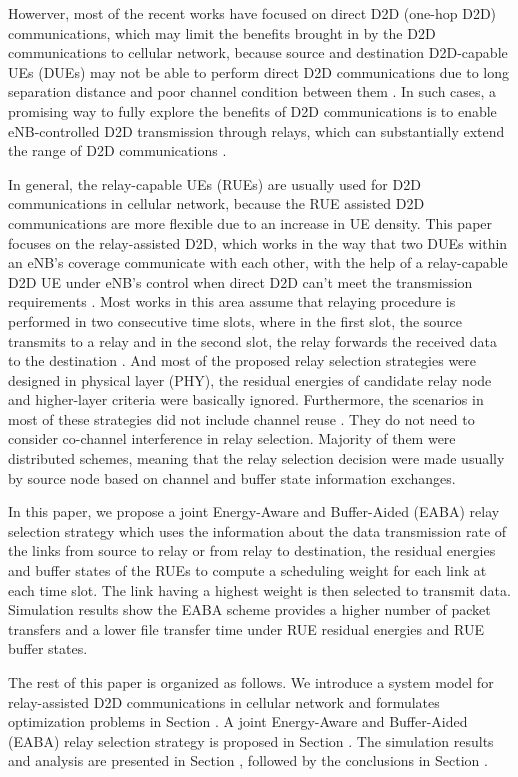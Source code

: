 \documentclass[conference]{IEEEtran}
\begin{document}
Howerver, most of the recent works have focused on direct D2D (one-hop D2D) communications, which may limit the benefits brought in by the D2D communications to cellular network, because source and destination D2D-capable UEs (DUEs) may not be able to perform direct D2D communications due to long separation distance and poor channel condition between them \cite{7876267}. In such cases, a promising way to fully explore the benefits of D2D communications is to enable eNB-controlled D2D transmission through relays, which can substantially extend the range of D2D communications \cite{7925800}.

In general, the relay-capable UEs (RUEs) are usually used for D2D communications in cellular network, because the RUE assisted D2D communications are more flexible due to an increase in UE density. This paper focuses on the relay-assisted D2D, which works in the way that two DUEs within an eNB's coverage communicate with each other, with the help of a relay-capable D2D UE under eNB's control when direct D2D can't meet the transmission requirements \cite{7450161,6940431,7752964}. Most works in this area assume that relaying procedure is performed in two consecutive time slots, where in the first slot, the source transmits to a relay and in the second slot, the relay forwards the received data to the destination \cite{6807959}. And most of the proposed relay selection strategies were designed in physical layer (PHY), the residual energies of candidate relay node and higher-layer criteria were basically ignored. Furthermore, the scenarios in most of these strategies did not include channel reuse \cite{7562509}. They do not need to consider co-channel interference in relay selection. Majority of them were distributed schemes, meaning that the relay selection decision were made usually by source node based on channel and buffer state information exchanges.

In this paper, we propose a joint Energy-Aware and Buffer-Aided (EABA) relay selection strategy which uses the information about the data transmission rate of the links from source to relay or from relay to destination, the residual energies and buffer states of the RUEs to compute a scheduling weight for each link at each time slot. The link having a highest weight is then selected to transmit data. Simulation results show the EABA scheme provides a higher number of packet transfers and a lower file transfer time under RUE residual energies and RUE buffer states.

The rest of this paper is organized as follows. We introduce a system model for relay-assisted D2D communications in cellular network and formulates optimization problems in Section \uppercase\expandafter{}. A joint Energy-Aware and Buffer-Aided (EABA) relay selection strategy is proposed in Section \uppercase\expandafter{}. The simulation results and analysis are presented in Section \uppercase\expandafter{}, followed by the conclusions in Section \uppercase\expandafter{}.
\end{document}
